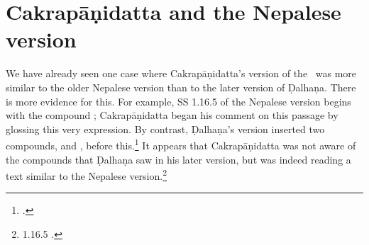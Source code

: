 

 
\section{Cakrapāṇidatta and the Nepalese version}

We have already seen one case where Cakrapāṇidatta's version of the \SS\ was more
similar to the older Nepalese version than to the later version of Ḍalhaṇa.  There
is more evidence for this.  For example, SS 1.16.5 of the Nepalese version begins
with the compound ; Cakrapāṇidatta began his comment on this
passage by glossing this very expression. By contrast, Ḍalhaṇa's version inserted
two compounds,  and ,
before this.\footnote{.} It appears that Cakrapāṇidatta was not
    aware of the compounds that Ḍalhaṇa saw in his later version, but was indeed
    reading a text similar to the Nepalese version.\footnote{1.16.5
        \citep[126–127]{acar-1939}.}
        

